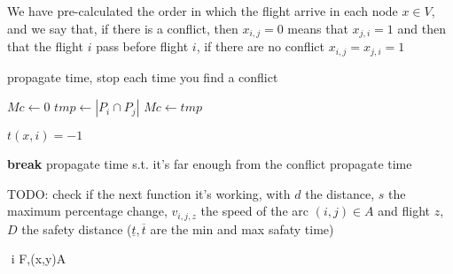 \documentclass[class=article, crop=false]{standalone}
\begin{document}

We have pre-calculated the order in which the flight arrive in each node $x\in V$, and we say that, if there is a conflict, then $x_{i,j}=0$ means that $x_{j,i}=1$ and then that the flight $i$ pass before flight $i$,
if there are no conflict $x_{i,j}=x_{j,i}=1$
\begin{algorithm}
\caption{propagate time, stop each time you find a conflict}\label{alg:propalgo}
\begin{algorithmic}

\STATE $Mc\gets 0$
        \STATE $tmp\gets |P_i\cap P_j|$
            \STATE $Mc\gets tmp$
        \ENDIF
    \ENDFOR
\ENDFOR

        \STATE $t(x,i)=-1$
    \ENDFOR
\ENDFOR

                    \STATE\textbf{break}
                \ELSE
                    \STATE propagate time s.t. it's far enough from the conflict \COMMENT{}
                \ENDIF
            \ELSE
                \STATE propagate time %
            \ENDIF
        \ENDFOR
    \ENDFOR
\ENDFOR

\end{algorithmic}
\end{algorithm}


TODO: check if the next function it's working, with $d$ the distance, $s$ the maximum percentage change, $v_{i,j,z}$ the speed of the arc $(i,j)\in A$ and flight $z$, $D$ the safety distance ($\underline t,\overline t$ are the min and max safaty time)

$$
\forall i \in F,\forall (x,y)\in A\\\newline
\end{document}
